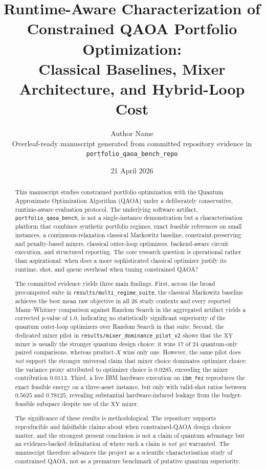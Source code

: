 \documentclass[11pt]{article}
\title{\textbf{Runtime-Aware Characterization of Constrained QAOA Portfolio Optimization:}\\
Classical Baselines, Mixer Architecture, and Hybrid-Loop Cost}
\author{Author Name\\
\small Overleaf-ready manuscript generated from committed repository evidence in \texttt{portfolio\_qaoa\_bench\_repo}}
\date{21 April 2026}
\begin{document}
\maketitle

\begin{abstract}
This manuscript studies constrained portfolio optimization with the Quantum Approximate Optimization Algorithm (QAOA) under a deliberately conservative, runtime-aware evaluation protocol. The underlying software artifact, \texttt{portfolio\_qaoa\_bench}, is not a single-instance demonstration but a characterisation platform that combines synthetic portfolio regimes, exact feasible references on small instances, a continuous-relaxation classical Markowitz baseline, constraint-preserving and penalty-based mixers, classical outer-loop optimizers, backend-aware circuit execution, and structured reporting. The core research question is operational rather than aspirational: when does a more sophisticated classical optimizer justify its runtime, shot, and queue overhead when tuning constrained QAOA?

The committed evidence yields three main findings. First, across the broad precomputed suite in \texttt{results/multi\_regime\_suite}, the classical Markowitz baseline achieves the best mean raw objective in all 26 study contexts and every reported Mann--Whitney comparison against Random Search in the aggregated artifact yields a corrected \(p\)-value of \(1.0\), indicating no statistically significant superiority of the quantum outer-loop optimizers over Random Search in that suite. Second, the dedicated mixer pilot in \texttt{results/mixer\_dominance\_pilot\_v2} shows that the \(\mathrm{XY}\) mixer is usually the stronger quantum design choice: it wins 17 of 24 quantum-only paired comparisons, whereas \(\mathrm{product}\text{-}X\) wins only one. However, the same pilot does \emph{not} support the stronger universal claim that mixer choice dominates optimizer choice: the variance proxy attributed to optimizer choice is \(0.0285\), exceeding the mixer contribution \(0.0113\). Third, a live IBM hardware execution on \texttt{ibm\_fez} reproduces the exact feasible energy on a three-asset instance, but only with valid-shot ratios between \(0.5625\) and \(0.78125\), revealing substantial hardware-induced leakage from the budget-feasible subspace despite use of the \(\mathrm{XY}\) mixer.

The significance of these results is methodological. The repository supports reproducible and falsifiable claims about when constrained-QAOA design choices matter, and the strongest present conclusion is not a claim of quantum advantage but an evidence-backed delimitation of where such a claim is \emph{not yet} warranted. The manuscript therefore advances the project as a scientific characterisation study of constrained QAOA, not as a premature benchmark of putative quantum superiority.
\end{abstract}
\end{document}
